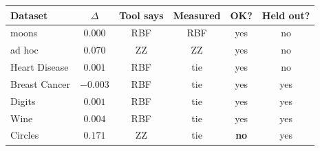 \begin{tabular}{@{}lccccc@{}}\toprule
Dataset & $\Delta$ & Tool says & Measured & OK? & Held out?\\\midrule
moons & $0.000$ & RBF & RBF & yes & no\\
ad hoc & $0.070$ & ZZ & ZZ & yes & no\\
Heart Disease & $0.001$ & RBF & tie & yes & no\\
Breast Cancer & $-0.003$ & RBF & tie & yes & yes\\
Digits & $0.001$ & RBF & tie & yes & yes\\
Wine & $0.004$ & RBF & tie & yes & yes\\
Circles & $0.171$ & ZZ & tie & \textbf{no} & yes\\\bottomrule
\end{tabular}
